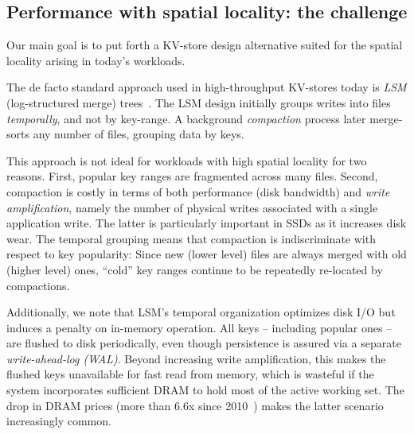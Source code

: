 \subsection{Performance with spatial locality: the challenge }  

Our main goal is to 
put forth a KV-store design alternative  suited for the 
spatial locality arising in today's  workloads. 


The de facto standard approach used in high-throughput KV-stores today is \emph{LSM} (log-structured merge) trees~\cite{DBLP:journals/acta/ONeilCGO96}. 
The LSM design initially groups writes  into files \emph{temporally}, and not by key-range. 
A background \emph{compaction} process later merge-sorts any number of files, grouping data by keys. 

This approach is not ideal for workloads with high spatial locality for two reasons. 
First,  popular key ranges are fragmented across many files. 
Second,  compaction  is costly in terms of  both performance 
(disk bandwidth) and \emph{write amplification}, namely the number of physical writes 
associated with a single application write. The latter is  particularly important in SSDs as it increases disk wear. 
The temporal grouping means that compaction is indiscriminate with respect to key popularity:  
Since new (lower level) files are always merged with old (higher level) ones, 
 ``cold'' key ranges  continue to be repeatedly re-located by  compactions.  

Additionally, we note that LSM's temporal  organization optimizes disk I/O but induces a penalty on in-memory operation. 
All keys -- including popular ones -- are flushed to disk periodically, even though persistence is assured via a separate \emph{write-ahead-log (WAL)}.
Beyond increasing write amplification, this makes the flushed keys unavailable for fast read from memory,
which is  wasteful if the system incorporates sufficient DRAM to hold most of the active working set. 
The drop in DRAM prices (more than $6.6$x since 2010~\cite{dram-prices}) makes the latter scenario increasingly common.  

